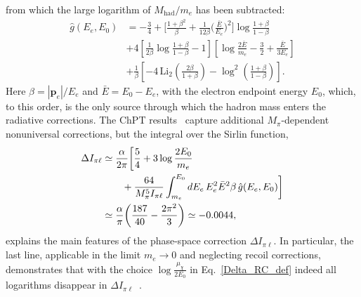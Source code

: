 \documentclass[prl,twocolumn,twoside,preprintnumbers,superscriptaddress,nofootinbib,letterpaper]{revtex4-1}
\newcommand{\mpi}{M_\pi}
\newcommand{\Mhad}{M_\text{had}}
\begin{document}
from which the large logarithm of $\Mhad/m_e$ has been subtracted:
\begin{align}
\label{Sirlin}
\hat g (E_e, E_0)  & = - \frac{3}{4}
+ \bigg[\frac{1 + \beta^2}{\beta}
+ \frac{1}{12 \beta} \bigg( \frac{\bar E}{E_e}\bigg)^2\bigg]  \log \frac{1+\beta}{1-\beta}
\nonumber \\
&+4 \left[ \frac{1}{2 \beta} \log \frac{1+\beta}{1-\beta} - 1 \right] \left[ \log \frac{2 \bar E}{m_e}  - \frac{3}{2} + \frac{\bar E}{3 E_e} \right]
\nonumber \\
&+
\frac{1}{\beta} \left[ - 4 \,  \text{Li}_2 \left( \frac{2 \beta}{1 + \beta} \right) - \log^2 \left( \frac{1+\beta}{1-\beta} \right)   \right].
\end{align}
Here  $\beta = |\mathbf{p}_e|/E_e$ and $\bar E = E_0 - E_e$, with the electron endpoint energy  $E_0$, which, to this order, is the only source through which the hadron mass  enters the radiative corrections.
The ChPT results~\cite{Cirigliano:2002ng} capture additional $\mpi$-dependent nonuniversal corrections, but the integral over the Sirlin function,
\begin{align}
\Delta I_{\pi\ell}&\simeq \frac{\alpha}{2\pi}\bigg[\frac{5}{4}+3\log\frac{2E_0}{m_e}\notag\\
&\qquad+\frac{64}{\mpi^5I_{\pi\ell}}\int_{m_e}^{E_0}dE_e\,E_e^2\bar E^2 \beta \,\hat g (E_e, E_0)\bigg]\notag\\
&\simeq\frac{\alpha}{\pi}\bigg(\frac{187}{40}-\frac{2\pi^2}{3}\bigg)\simeq -0.0044,
\end{align}
explains the main features of the phase-space correction $\Delta I_{\pi\ell}$. In particular, the last line, applicable in the limit $m_e\to 0$ and neglecting recoil corrections, demonstrates that with the choice $\log\frac{\mu_\chi}{2E_0}$ in Eq.~\eqref{Delta_RC_def} indeed all logarithms disappear in $\Delta I_{\pi\ell}$~\cite{Passera:2011ae}.
\end{document}
